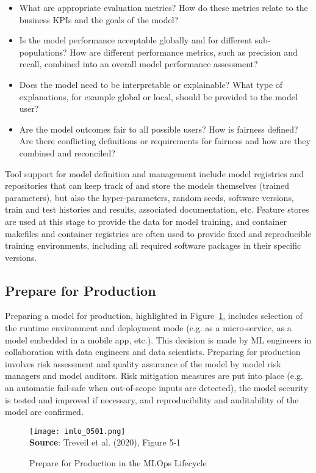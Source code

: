 \begin{itemize}
   \item What are appropriate evaluation metrics? How do these metrics relate to the business KPIs and the goals of the model?
   \item Is the model performance acceptable globally and for different sub-populations? How are different performance metrics, such as precision and recall, combined into an overall model performance assessment?
   \item Does the model need to be interpretable or explainable? What type of explanations, for example global or local, should be provided to the model user? 
   \item Are the model outcomes fair to all possible users? How is fairness defined? Are there conflicting definitions or requirements for fairness and how are they combined and reconciled?
\end{itemize}

Tool support for model definition and management include model registries and repositories that can keep track of and store the models themselves (trained parameters), but also the hyper-parameters, random seeds, software versions, train and test histories and results, associated documentation, etc. Feature stores are used at this stage to provide the data for model training, and container makefiles and container registries are often used to provide fixed and reproducible training environments, including all required software packages in their specific versions.  

\subsection{Prepare for Production}

Preparing a model for production, highlighted in Figure~\ref{fig:prepareforproduction}, includes selection of the runtime environment and deployment mode (e.g. as a micro-service, as a model embedded in a mobile app, etc.). This decision is made by ML engineers in collaboration with data engineers and data scientists. Preparing for production involves risk assessment and quality assurance of the model by model risk managers and model auditors. Risk mitigation measures are put into place (e.g. an automatic fail-safe when out-of-scope inputs are detected), the model security is tested and improved if necessary, and reproducibility and auditability of the model are confirmed. 

\begin{figure}[h]
\centering
\texttt{[image: imlo\_0501.png]} \\

\vspace{\baselineskip}
\scriptsize \textbf{Source}: Treveil et al. (2020), Figure 5-1
\caption{Prepare for Production in the MLOps Lifecycle}
\label{fig:prepareforproduction}
\end{figure}

